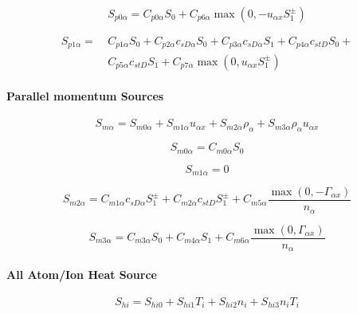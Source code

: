 \documentclass[a4paper,10pt]{report}
\begin{document}
\begin{equation}
S_{p0\alpha}=C_{p0\alpha}S_{0}+C_{p6\alpha}
\max\left( 0,-u_{\alpha x}S_{1}^{\pm}\right)   \label{91}
\end{equation}

\begin{equation}\begin{split}
S_{p1\alpha}= ~ & C_{p1\alpha}S_{0}+C_{p2\alpha}c_{sD\alpha}S_{0}+C_{p3\alpha}
c_{sD\alpha}S_{1}+C_{p4\alpha}c_{stD}S_{0}+ \\
~ & C_{p5\alpha}c_{stD}S_{1}+C_{p7\alpha}\max\left( 0,u_{\alpha x}S_{1}^{\pm}\right)   \label{92}
\end{split}\end{equation}

\paragraph{Parallel momentum Sources}

\begin{equation}
S_{m\alpha}=S_{m0\alpha}+S_{m1\alpha}u_{\alpha x}+S_{m2\alpha}\rho_{\alpha}
+S_{m3\alpha}\rho_{\alpha}u_{\alpha x}   \label{93}
\end{equation}

\begin{equation}
S_{m0\alpha}=C_{m0\alpha}S_{0}   \label{94}
\end{equation}

\begin{equation}
S_{m1\alpha}=0   \label{95}
\end{equation}

\begin{equation}
S_{m2\alpha}=C_{m1\alpha}c_{sD\alpha}S_{1}^{\pm}+C_{m2\alpha}c_{stD}S_{1}^{\pm}
+C_{m5\alpha}\frac{\max\left( 0,-\Gamma_{\alpha x}\right) }{n_{\alpha }}
\label{96}
\end{equation}

\begin{equation}
S_{m3\alpha}=C_{m3\alpha}S_{0}+C_{m4\alpha}S_{1}+C_{m6\alpha}
\frac{\max\left( 0,\Gamma_{\alpha x}\right) }{n_{\alpha}}   \label{97}
\end{equation}

\paragraph{All Atom/Ion Heat Source}

\begin{equation}
S_{hi}=S_{hi0}+S_{hi1}T_{i}+S_{hi2}n_{i}+S_{hi3}n_{i}T_{i}   \label{98}
\end{equation}
\end{document}
